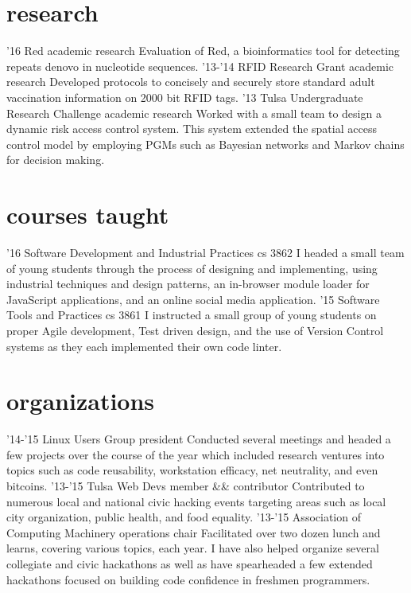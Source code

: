 \documentclass[]{friggeri-cv}
\begin{document}
\section{research}

\begin{entrylist}
  \entry
    {'16}
    {Red}
    {academic research}
    {Evaluation of Red, a bioinformatics tool for detecting repeats denovo in nucleotide sequences.}
  \entry
    {'13-'14}
    {RFID Research Grant}
    {academic research}
    {Developed protocols to concisely and securely store standard adult vaccination information on 2000 bit RFID tags.}
  \entry
    {'13}
    {Tulsa Undergraduate Research Challenge}
    {academic research}
    {Worked with a small team to design a dynamic risk access control system. This system extended the spatial access control model by employing PGMs such as Bayesian networks and Markov chains for decision making.}
\end{entrylist}

\section{courses taught}

\begin{entrylist}
  \entry
    {'16}
    {Software Development and Industrial Practices}
    {cs 3862}
    {I headed a small team of young students through the process of designing and implementing, using industrial techniques and design patterns, an in-browser module loader for JavaScript applications, and an online social media application.}
  \entry
    {'15}
    {Software Tools and Practices}
    {cs 3861}
    {I instructed a small group of young students on proper Agile development, Test driven design, and the use of Version Control systems as they each implemented their own code linter.}
\end{entrylist}

\section{organizations}

\begin{entrylist}
  \entry
    {'14-'15}
    {Linux Users Group}
    {president}
    {Conducted several meetings and headed a few projects over the course of the year which included research ventures into topics such as code reusability, workstation efficacy, net neutrality, and even bitcoins.}
  \entry
    {'13-'15}
    {Tulsa Web Devs}
    {member \&\& contributor}
    {Contributed to numerous local and national civic hacking events targeting areas such as local city organization, public health, and food equality.}
  \entry
    {'13-'15}
    {Association of Computing Machinery}
    {operations chair}
    {Facilitated over two dozen lunch and learns, covering various topics, each year. I have also helped organize several collegiate and civic hackathons as well as have spearheaded a few extended hackathons focused on building code confidence in freshmen programmers.}
\end{entrylist}
\end{document}

